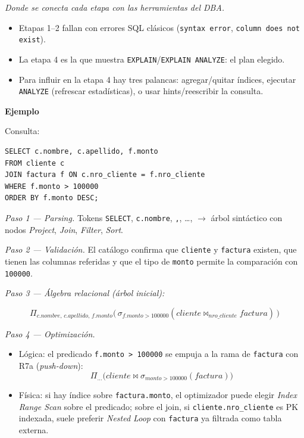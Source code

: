 \documentclass[11pt,a4paper]{article}
\newcommand{\itemcabecera}[1]{\noindent\textbf{#1}\par\medskip}
\newcommand{\bloqueEjemplo}{\itemcabecera{Ejemplo}}
\begin{document}
\textit{Donde se conecta cada etapa con las herramientas del DBA.}

\begin{itemize}
    \item Etapas 1--2 fallan con errores SQL clásicos (\texttt{syntax error}, \texttt{column does not exist}).
    \item La etapa 4 es la que muestra \texttt{EXPLAIN}/\texttt{EXPLAIN ANALYZE}: el plan elegido.
    \item Para influir en la etapa 4 hay tres palancas: agregar/quitar índices, ejecutar \texttt{ANALYZE} (refrescar estadísticas), o usar hints/reescribir la consulta.
\end{itemize}

\bloqueEjemplo

Consulta:

\begin{lstlisting}
SELECT c.nombre, c.apellido, f.monto
FROM cliente c
JOIN factura f ON c.nro_cliente = f.nro_cliente
WHERE f.monto > 100000
ORDER BY f.monto DESC;
\end{lstlisting}

\textit{Paso 1 --- Parsing.} Tokens \texttt{SELECT}, \texttt{c.nombre}, \texttt{,}, \dots, $\to$ árbol sintáctico con nodos \emph{Project}, \emph{Join}, \emph{Filter}, \emph{Sort}.

\textit{Paso 2 --- Validación.} El catálogo confirma que \texttt{cliente} y \texttt{factura} existen, que tienen las columnas referidas y que el tipo de \texttt{monto} permite la comparación con \texttt{100000}.

\textit{Paso 3 --- Álgebra relacional (árbol inicial):}

\[
\Pi_{c.nombre,\,c.apellido,\,f.monto}\big(\,
\sigma_{f.monto > 100000}(cliente \bowtie_{nro\_cliente} factura)\,\big)
\]

\textit{Paso 4 --- Optimización.}

\begin{itemize}
    \item Lógica: el predicado \texttt{f.monto > 100000} se empuja a la rama de \texttt{factura} con R7a (\emph{push-down}):
    \[
    \Pi_{\ldots}\big(cliente \bowtie \sigma_{monto > 100000}(factura)\big)
    \]
    \item Física: si hay índice sobre \texttt{factura.monto}, el optimizador puede elegir \emph{Index Range Scan} sobre el predicado; sobre el join, si \texttt{cliente.nro\_cliente} es PK indexada, suele preferir \emph{Nested Loop} con \texttt{factura} ya filtrada como tabla externa.
\end{itemize}
\end{document}
